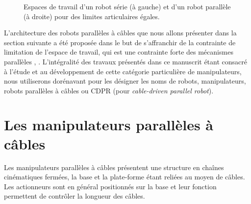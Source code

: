 \begin{figure}[!ht]
  \centering
\hfill
    \caption{\footnotesize{Espaces de travail d'un robot série (\`a gauche) et 
d'un robot parall\`ele (\`a droite) pour des limites articulaires \'egales.}}
\label{intro:fig3b}
\end{figure}

L'architecture des robots parallèles à c\^ables que nous allons présenter dans 
la section suivante a été proposée dans le but de s'affranchir de la contrainte 
de limitation de l'espace de travail, qui est une contrainte forte des 
mécanismes parallèles \cite{journals/jfr/AlbusBD93}, 
\cite{1985:Landsberger.Sheridan*1}. L'intégralité des travaux présentés 
dans ce manuscrit étant consacré à l'étude et au développement de cette 
catégorie particulière de manipulateurs, nous utiliserons dorénavant pour les 
désigner les noms de robots, manipulateurs, robots parallèles à câbles ou CDPR 
(pour {\it cable-driven parallel robot}).

\section{Les manipulateurs parallèles à câbles} \label{chap0-1}

Les manipulateurs parallèles à câbles présentent une structure en chaînes 
cinéma\-tiques fermées, la base et la plate-forme étant reliées au moyen de 
câbles. Les actionneurs sont en général positionnés sur la base et leur 
fonction permettent de contrôler la longueur des câbles.

